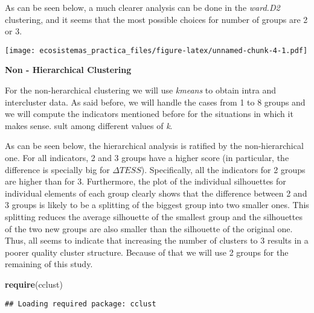 \documentclass[]{article}
\newenvironment{Shaded}{\begin{snugshade}}{\end{snugshade}}
\newcommand{\KeywordTok}[1]{\textcolor[rgb]{0.13,0.29,0.53}{\textbf{#1}}}
\newcommand{\NormalTok}[1]{#1}
\begin{document}
As can be seen below, a much clearer analysis can be done in the
\emph{ward.D2} clustering, and it seems that the most possible choices
for number of groups are 2 or 3.

\texttt{[image: ecosistemas\_practica\_files/figure-latex/unnamed-chunk-4-1.pdf]}

\textbf{Non - Hierarchical Clustering}

For the non-herarchical clustering we will use \emph{kmeans} to obtain
intra and intercluster data. As said before, we will handle the cases
from 1 to 8 groups and we will compute the indicators mentioned before
for the situations in which it makes sense. sult among different values
of \emph{k}.

As can be seen below, the hierarchical analysis is ratified by the
non-hierarchical one. For all indicators, 2 and 3 groups have a higher
score (in particular, the difference is specially big for
\(\Delta TESS\)). Specifically, all the indicators for 2 groups are
higher than for 3. Furthermore, the plot of the individual silhouettes
for individual elements of each group clearly shows that the difference
between 2 and 3 groups is likely to be a splitting of the biggest group
into two smaller ones. This splitting reduces the average silhouette of
the smallest group and the silhouettes of the two new groups are also
smaller than the silhouette of the original one. Thus, all seems to
indicate that increasing the number of clusters to 3 results in a poorer
quality cluster structure. Because of that we will use 2 groups for the
remaining of this study.

\begin{Shaded}
\begin{Highlighting}[]
\KeywordTok{require}\NormalTok{(cclust)}
\end{Highlighting}
\end{Shaded}

\begin{verbatim}
## Loading required package: cclust
\end{verbatim}
\end{document}

